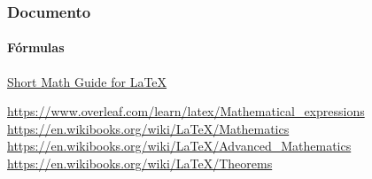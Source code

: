 \begin{frame}[fragile]
\frametitle{Documento}
\framesubtitle{Fórmulas}
\href{http://tug.ctan.org/info/short-math-guide/short-math-guide.pdf}{Short Math Guide for \LaTeX}

\url{https://www.overleaf.com/learn/latex/Mathematical_expressions}
\url{https://en.wikibooks.org/wiki/LaTeX/Mathematics}
\url{https://en.wikibooks.org/wiki/LaTeX/Advanced_Mathematics}
\url{https://en.wikibooks.org/wiki/LaTeX/Theorems}
\end{frame}
